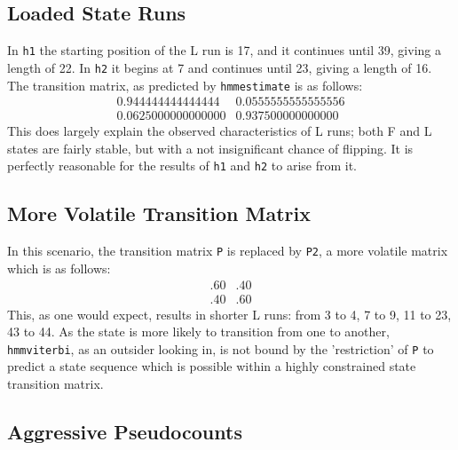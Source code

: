 \documentclass[titlepage]{scrartcl}
\begin{document}
\subsection{Loaded State Runs}
In \verb|h1| the starting position of the L run is 17, and it continues until 39, giving a length of 22.  In \verb|h2| it begins at 7 and continues until 23, giving a length of 16.  The transition matrix, as predicted by \verb|hmmestimate| is as follows:
\[\begin{array}{cc}
	0.944444444444444 & 0.0555555555555556 \\
	0.0625000000000000 & 0.937500000000000
\end{array}\]
This does largely explain the observed characteristics of L runs; both F and L states are fairly stable, but with a not insignificant chance of flipping.  It is perfectly reasonable for the results of \verb|h1| and \verb|h2| to arise from it.
\subsection{More Volatile Transition Matrix}
In this scenario, the transition matrix \verb|P| is replaced by \verb|P2|, a more volatile matrix which is as follows:
\[
\begin{array}{cc}
	.60 & .40 \\
	.40 & .60
\end{array}
\]
This, as one would expect, results in shorter L runs: from 3 to 4, 7 to 9, 11 to 23, 43 to 44.  As the state is more likely to transition from one to another, \verb|hmmviterbi|, as an outsider looking in, is not bound by the 'restriction' of \verb|P| to predict a state sequence which is possible within a highly constrained state transition matrix.
\subsection{Aggressive Pseudocounts}
\end{document}
